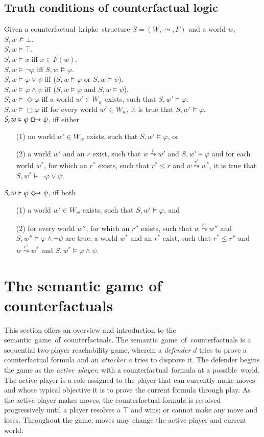 \documentclass[a4paper,american]{paper}
\theoremstyle{definition}\newtheorem{definition}{Definition}
\begin{document}
\subsection{Truth conditions of counterfactual logic}
Given a counterfactual~kripke~structure $S = (W, \leadsto ,F)$ and a world $w$,\\
$S,w\nvDash\bot$.\\
$S,w\vDash\top$.\\
$S,w\vDash x$ iff $x\in F(w)$.\\
$S,w\vDash \neg\varphi$ iff $S,w\nvDash\varphi$.\\
$S,w\vDash \varphi\vee\psi$ iff ($S,w\vDash\varphi$ or $S,w\vDash\psi$).\\
$S,w\vDash \varphi\wedge\psi$ iff ($S,w\vDash\varphi$ and $S,w\vDash\psi$).\\
$S,w\vDash \Diamond \varphi$ iff a world $w'\in W_w$ exists, such that $S,w' \vDash \varphi$.\\
$S,w\vDash \Box \varphi$ iff for every world $w'\in W_w$, it is true that $S,w' \vDash \varphi$.\\
$S,w \vDash \varphi \boxright \psi$, iff either
\begin{itemize}
	\item[(1)] no world $w'\in W_w$ exists, such that $S,w' \vDash \varphi$, or
	\item[(2)] a world $w'$ and an $r$ exist, such that $w\overset{r}{\leadsto} w'$ and $S,w'\vDash \varphi$ and for each world $w^*$, for which an $r^*$ exists, such that $r^*\leq r$ and $w\overset{r^*}{\leadsto} w^*$, it is true that $S,w^*\vDash\neg\varphi\vee\psi$.
\end{itemize}
\noindent$S,w\vDash \varphi \Diamondright \psi$, iff both 
\begin{itemize}
	\item[(1)] a world $w'\in W_w$ exists, such that $S,w' \vDash \varphi$, and
	\item[(2)] for every world $w''$, for which an $r''$ exists, such that $w\overset{r''}{\leadsto}w''$ and $S,w'' \vDash \varphi\wedge\neg\psi$ are true, a world $w^*$ and an $r^*$ exist, such that $r^* \leq r''$ and $w\overset{r^*}{\leadsto}w^*$ and $S,w^* \vDash \varphi\wedge\psi$.
\end{itemize}
\section{The semantic game of counterfactuals}
This section offers an overview and introduction to the semantic~game~of~counterfactuals. The semantic~game~of~counterfactuals is a sequential two-player reachability game, wherein a \textit{defender} $d$ tries to prove a counterfactual formula and an \textit{attacker} $a$ tries to disprove it. The defender begins the game as the \textit{active~player}, with a counterfactual~formula at a possible~world. The active player is a role assigned to the player that can currently make moves and whose typical objective it is to prove the current formula through play. As the active player makes moves, the counterfactual formula is resolved progressively until a player resolves a $\top$ and wins; or cannot make any move and loses. Throughout the game, moves may change the active player and current world.
\newpage
\end{document}
